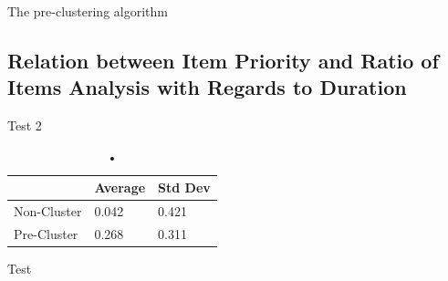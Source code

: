 \documentclass[12pt]{article}
\begin{document}
\par{The pre-clustering algorithm }

\subsection{Relation between Item Priority and Ratio of Items Analysis with Regards to Duration}

\par{Test 2}

\begin{table}[h]
\centering
\begin{tabular}{|l|l|l|}
\hline
            & Average & Std Dev \\ \hline
Non-Cluster & 0.042   & 0.421   \\ \hline
Pre-Cluster & 0.268   & 0.311   \\ \hline
\end{tabular}
\caption{•}
\end{table}

\par{Test}
\end{document}
